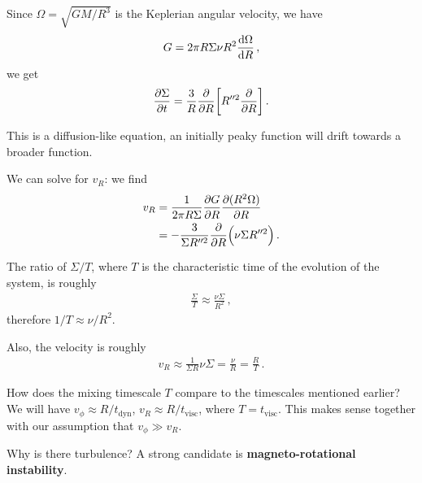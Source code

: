\documentclass[main.tex]{subfiles}
\begin{document}
Since \(\Omega = \sqrt{GM / R^3} \) is the Keplerian angular velocity, we have 
%
\begin{align}
G = 2 \pi R \Sigma \nu R^2 \dv{\Omega }{R}
\,,
\end{align}
%
we get 
%
\begin{align}
\pdv{\Sigma }{t} = \frac{3}{R} \pdv{}{R} \qty[R^{\prime \prime 2} \pdv{}{R} (\nu \Sigma R^{\prime \prime 2})] 
\,.
\end{align}

This is a diffusion-like equation, an initially peaky function will drift towards a broader function. 

We can solve for \(v_R\): we find 
%
\begin{align}
v_R &= \frac{1}{2 \pi R \Sigma } \pdv{G}{R} \pdv{(R^2 \Omega )}{R}  \\
&= - \frac{3}{\Sigma R^{\prime \prime 2} } \pdv{}{R} \qty(\nu \Sigma R^{\prime \prime 2}) 
\,.
\end{align}

The ratio of \(\Sigma / T\), where \(T\) is the characteristic time of the evolution of the system, is roughly 
%
\begin{align}
\frac{\Sigma}{T} \approx \frac{\nu \Sigma }{R^2}
\,,
\end{align}
%
therefore \( 1/ T \approx \nu / R^2\).

Also, the velocity is roughly 
%
\begin{align}
v_R \approx \frac{1}{\Sigma R} \nu \Sigma = \frac{\nu}{R} = \frac{R}{T}
\,.
\end{align}

How does the mixing timescale \(T\) compare to the timescales mentioned earlier? 
We will have \(v_\phi \approx R / t _{\text{dyn}}\), \(v_R \approx R / t _{\text{visc}}\), where \(T = t _{\text{visc}}\). 
This makes sense together with our assumption that \(v_\phi \gg v_R\). 

Why is there turbulence? A strong candidate is \textbf{magneto-rotational instability}. 
\end{document}
